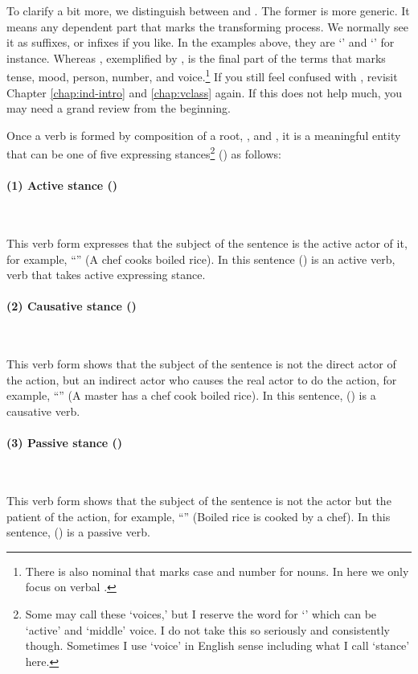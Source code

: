 To clarify a bit more, we distinguish between  and . The former is more generic. It means any dependent part that marks the transforming process. We normally see it as suffixes, or infixes if you like. In the examples above, they are `' and `' for instance. Whereas , exemplified by , is the final part of the terms that marks tense, mood, person, number, and voice.\footnote{There is also nominal  that marks case and number for nouns. In here we only focus on verbal .} If you still feel confused with , revisit Chapter \ref{chap:ind-intro} and \ref{chap:vclass} again. If this does not help much, you may need a grand review from the beginning.

Once a verb is formed by composition of a root, , and , it is a meaningful entity that can be one of five expressing stances\footnote{Some may call these `voices,' but I reserve the word for `' which can be `active' and `middle' voice. I do not take this so seriously and consistently though. Sometimes I use `voice' in English sense including what I call `stance' here.} () as follows:

\paragraph*{(1) Active stance ()} \ \par
This verb form expresses that the subject of the sentence is the active actor of it, for example, ``'' (A chef cooks boiled rice). In this sentence  () is an active verb, verb that takes active expressing stance.

\paragraph*{(2) Causative stance ()} \ \par
This verb form shows that the subject of the sentence is not the direct actor of the action, but an indirect actor who causes the real actor to do the action, for example, ``'' (A master has a chef cook boiled rice). In this sentence,  () is a causative verb.

\paragraph*{(3) Passive stance ()} \ \par
This verb form shows that the subject of the sentence is not the actor but the patient of the action, for example, ``'' (Boiled rice is cooked by a chef). In this sentence,  () is a passive verb.

